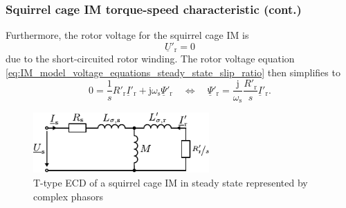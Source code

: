\begin{frame}
	\frametitle{Squirrel cage IM torque-speed characteristic (cont.)} 
     Furthermore, the rotor voltage for the squirrel cage IM is
     $$
        \underline{U}'_\mathrm{r} = 0
    $$
    due to the short-circuited rotor winding. \pause The rotor voltage equation \eqref{eq:IM_model_voltage_equations_steady_state_slip_ratio} then simplifies to
    \begin{equation}
        0 = \frac{1}{s}R'_\mathrm{r}\underline{I}'_\mathrm{r}+\mathrm{j}\omega_\mathrm{s}\underline{\Psi}'_\mathrm{r} \quad \Leftrightarrow \quad \underline{\Psi}'_\mathrm{r} = \frac{\mathrm{j}}{\omega_\mathrm{s}}\frac{R'_\mathrm{r}}{s}\underline{I}'_\mathrm{r}. 
        \label{eq:IM_model_rotor_flux_steady_state}
    \end{equation}
    \begin{figure}
        \centering
        \includegraphics[width=0.6\textwidth]{fig/lec06/IM_squirrel_T_ECD_steady_state.pdf}
        \caption{T-type ECD of a squirrel cage IM in steady state represented by complex phasors}
        \label{fig:IM_squirrel_T_ECD_steady_state}
    \end{figure}
\end{frame}

